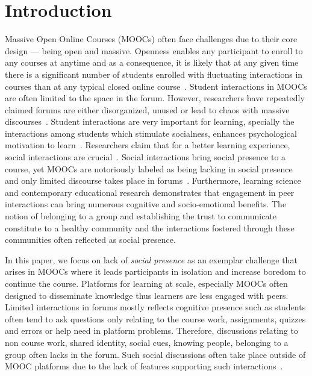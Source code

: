\documentclass[manuscript,screen,review]{acmart}
\begin{document}
\section{Introduction}
Massive Open Online Courses (MOOCs) often face challenges due to their core design --- being open and massive. Openness enables any participant to enroll to any courses at anytime and as a consequence, it is likely that at any given time there is a significant number of students enrolled with fluctuating interactions in courses than at any typical closed online course~\cite{oleksandra2016untangling}. Student interactions in MOOCs are often limited to the space in the forum. However, researchers have repeatedly claimed forums are either disorganized, unused or lead to chaos with massive discourses~\cite{coetzee2014should}. Student interactions are very important for learning, specially the interactions among students which stimulate socialness, enhances psychological motivation to learn~\cite{coetzee2014should}. Researchers claim that for a better learning experience, social interactions are crucial~\cite{yang2007students}. Social interactions bring social presence to a course, yet MOOCs are notoriously labeled as being lacking in social presence and only limited discourse takes place in forums~\cite{antonaci2019gamification}. Furthermore,
learning science and contemporary educational research demonstrates that engagement in peer interactions can bring numerous cognitive and socio-emotional benefits. The notion of belonging to a group and establishing the trust to communicate constitute to a healthy community and the interactions fostered through these communities often reflected as social presence. 

In this paper, we focus on lack of \textit{social presence} as an exemplar challenge that arises in MOOCs where it leads participants in isolation and increase boredom to continue the course. Platforms for learning at scale, especially MOOCs often designed to disseminate knowledge thus learners are less engaged with peers. Limited interactions in forums mostly reflects cognitive presence such as students often tend to ask questions only relating to the course work, assignments, quizzes and errors or help need in platform problems. Therefore, discussions relating to non course work, shared identity, social cues, knowing people, belonging to a group often lacks in the forum. Such social discussions often take place outside of MOOC platforms due to the lack of features supporting such interactions~\cite{veletsianos2015digging}. 
\end{document}
